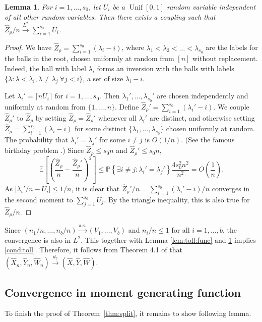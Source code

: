 \documentclass[11pt]{article}
\newcommand{\E}[1]{\mathbb{E} \left[#1\right]}
\newcommand{\ball}[1]{\hat{#1}}
\def\bX{\ball{X}}
\def\bY{\ball{Y}}
\def\bW{\ball{W}}
\newcommand{\bVec}{(\bX, \bY, \bW)}
\newcommand{\bVecN}{(\bX_n, \bY_n, \bW_n)}
\def\bZ{\ball{Z}}
\def\l{\lambda}
\def\r{\rho}
\newcommand\Prob[1]{{\mathbb{P}\left\{#1\right\}}}
\numberwithin{theorem}{section}
\newtheorem{lemma}[theorem]{Lemma}
\newcommand{\bfrac}[2]{\left({\frac{#1}{#2}}\right)}
\theoremstyle{definition}
\newcommand{\ceil}[1]{\lceil #1 \rceil}
\newcommand{\dM}{d_2}
\newcommand{\dMto}{\overset{\dM}{\too}}
\newcommand{\inas}{\asto} %
\newcommand{\inLII}{\overset{L^{2}}{\too}}
\newcommand{\Unif}{\mathop{\mathrm{Unif}}}
\numberwithin{equation}{section}
\newcommand{\refT}[1]{Theorem~\ref{#1}}
\newcommand{\too}{\longrightarrow}
\newcommand\asto{\overset{\mathrm{a.s.}}{\too}}
\begin{document}
\begin{lemma}
    \label{lem:root:unif}
    For \(i = 1,\dots,s_0\), let \(U_i\) be a \(\Unif[0,1]\) random variable independent of
    all other random variables.  Then there exists a coupling such that \({\bZ{}_{\rho}}/{n} \inLII
    \sum_{i=1}^{s_0} U_{i}\).
\end{lemma}

\begin{proof}
We have $\bZ_\r = \sum_{i=1}^{s_0} (\l_i - i)$, where $\l_1 < \l_2 < \dots < \l_{s_0}$ are the
labels for the balls in the root, chosen uniformly at random from $[n]$ without replacement. Indeed,
the ball with label $\l_i$ forms an inversion with the balls with labels $\{\l : \l < \l_i, \l \neq
\l_j \ \forall j<i\}$, a set of size $\l_i-i$.

Let \(\lambda_{i}' = \ceil{n U_{i}}\) for \(i=1,\dots,s_0\).
Then $\l_1', \dots,\l_{s_0}'$ are chosen independently and uniformly at random from $\{1,\dots,
n\}$. Define $\bZ_\r' = \sum_{i=1}^{s_0} (\l_i' - i)$. We couple $\bZ_\r'$ to $\bZ_\r$ by setting
$\bZ_\r = \bZ_\r'$ whenever all $\l_i'$ are distinct, and otherwise setting $\bZ_\r =
\sum_{i=1}^{s_0}(\l_i - i)$ for some distinct $\{\l_1,\dots,\l_{s_0}\}$ chosen uniformly at random. The
probability that $\l_i' = \l_j'$ for some $i\neq j$ is $O(1/n)$. (See the famous birthday problem
\cite[Example 3.2.5]{d10}.) Since $\bZ_\r \leq s_0n$ and
$\bZ_\r' \leq s_0n$, 
$$
\E{\left(\frac{\bZ_\r}{n} - \frac{\bZ_\r'}{n}\right)^2} 
\le \Prob{\exists i\neq j : \l_i' = \l_j'} \frac{4s_0^2n^2}{n^2} = O\bfrac1n.
$$
As  $|\l_i'/n - U_{i}| \le 1/n$, it is clear that
$\bZ_\r'/n = \sum_{i=1}^{s_0} (\l_i' - i)/n$ converges in the second moment to $\sum_{j=1}^{s_0} U_j$.
By the triangle inequality, this is also true for $\bZ_\r/n$.
\end{proof}

Since \( (n_1/n, \dots, n_b/n) \inas (V_1,\dots,V_b)\) and \(n_i/n \le 1\) for all \(i =
1,\dots,b\), the convergence is also in \(L^2\). This together with Lemma
\ref{lem:toll:func} 
and \ref{lem:root:unif} implies \eqref{cond:toll}. Therefore, it follows from Theorem 4.1 of
\citet{MR1871564} that \( \bVecN \dMto \bVec\).

\subsection{Convergence in moment generating function}
\label{sec:split:mgf}

To finish the proof of \refT{thm:split}, it remains to show following lemma.
\end{document}

